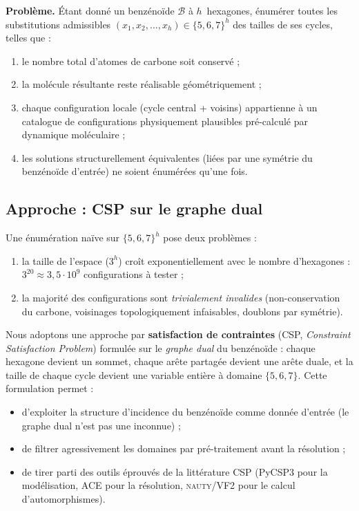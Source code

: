 \documentclass[12pt,a4paper]{article}
\theoremstyle{definition}
\theoremstyle{remark}
\newcommand{\B}{\mathcal{B}}
\begin{document}
\noindent\textbf{Probl\`eme.} \'Etant donn\'e un benz\'eno\"ide $\B$
\`a $h$~hexagones, \'enum\'erer toutes les substitutions admissibles
$(x_1, x_2, \ldots, x_h) \in \{5, 6, 7\}^h$ des tailles de ses cycles, telles
que :
\begin{enumerate}[label=(\roman*),leftmargin=*]
  \item le nombre total d'atomes de carbone soit conserv\'e ;
  \item la mol\'ecule r\'esultante reste r\'ealisable g\'eom\'etriquement ;
  \item chaque configuration locale (cycle central + voisins) appartienne
        \`a un catalogue de configurations \og physiquement plausibles \fg{}
        pr\'e-calcul\'e par dynamique mol\'eculaire ;
  \item les solutions \og structurellement \'equivalentes \fg{} (li\'ees
        par une sym\'etrie du benz\'eno\"ide d'entr\'ee) ne soient
        \'enum\'er\'ees qu'une fois.
\end{enumerate}

\subsection{Approche : CSP sur le graphe dual}

Une \'enum\'eration na\"ive sur $\{5,6,7\}^h$ pose deux probl\`emes :
\begin{enumerate}[leftmargin=*]
  \item la taille de l'espace ($3^h$) cro\^it exponentiellement avec
        le nombre d'hexagones : $3^{20} \approx 3{,}5 \cdot 10^9$
        configurations \`a tester ;
  \item la majorit\'e des configurations sont \emph{trivialement
        invalides} (non-conservation du carbone, voisinages topologiquement
        infaisables, doublons par sym\'etrie).
\end{enumerate}

Nous adoptons une approche par \textbf{satisfaction de contraintes}
(CSP, \emph{Constraint Satisfaction Problem}) formul\'ee sur le
\emph{graphe dual} du benz\'eno\"ide : chaque hexagone devient un sommet,
chaque ar\^ete partag\'ee devient une ar\^ete duale, et la taille de chaque
cycle devient une variable enti\`ere \`a domaine $\{5,6,7\}$. Cette
formulation permet :
\begin{itemize}
  \item d'exploiter la structure d'incidence du benz\'eno\"ide comme
        donn\'ee d'entr\'ee (le graphe dual n'est pas une inconnue) ;
  \item de filtrer agressivement les domaines par pr\'e-traitement
        avant la r\'esolution ;
  \item de tirer parti des outils \'eprouv\'es de la litt\'erature CSP
        (PyCSP3 pour la mod\'elisation, ACE pour la r\'esolution,
        \textsc{nauty}/VF2 pour le calcul d'automorphismes).
\end{itemize}
\end{document}
